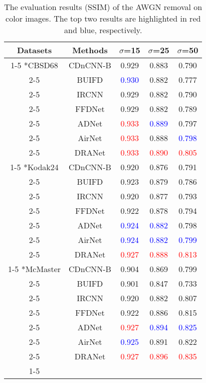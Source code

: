 \documentclass[3p,times]{elsarticle}
\begin{document}
\begin{table}[htbp]
\centering
\caption{The evaluation results (SSIM) of the AWGN removal on color images. The top two results are highlighted in red and blue, respectively.}
\label{tab:color_SSIM}
\begin{tabular}{ccccc}
\hline
Datasets & Methods & $\sigma$=15 & $\sigma$=25 & $\sigma$=50\\
\cline{1-5}
\multirow{7}*{CBSD68} & CDnCNN-B \cite{Zhang2017} & 0.929 & 0.883 & 0.790\\
\cline{2-5}
    & BUIFD \cite{Helou2020} & \textcolor{blue}{0.930} & 0.882 & 0.777\\
\cline{2-5}
    & IRCNN  \cite{ZhangZGZ2017} & 0.929 & 0.882 & 0.790\\
\cline{2-5}
    & FFDNet \cite{Zhang2018} & 0.929 & 0.882 & 0.789 \\
\cline{2-5}
    & ADNet \cite{TianX2020}  & \textcolor{red}{0.933} & \textcolor{blue}{0.889} & 0.797\\
\cline{2-5}
    & AirNet \cite{Li2022} & \textcolor{red}{0.933} & 0.888 & \textcolor{blue}{0.798}\\
\cline{2-5}
    & DRANet & \textcolor{red}{0.933} & \textcolor{red}{0.890} & \textcolor{red}{0.805}\\
\cline{1-5}
\multirow{7}*{Kodak24} & CDnCNN-B \cite{Zhang2017} & 0.920 & 0.876 & 0.791\\
\cline{2-5}
    & BUIFD \cite{Helou2020} & 0.923 & 0.879 & 0.786\\
\cline{2-5}
    & IRCNN  \cite{ZhangZGZ2017} & 0.920 & 0.877 & 0.793\\
\cline{2-5}
    & FFDNet \cite{Zhang2018} & 0.922 & 0.878 & 0.794\\
\cline{2-5}
    & ADNet \cite{TianX2020}  & \textcolor{blue}{0.924} & \textcolor{blue}{0.882} & 0.798\\
\cline{2-5}
    & AirNet \cite{Li2022} & \textcolor{blue}{0.924} & \textcolor{blue}{0.882} & \textcolor{blue}{0.799}\\
\cline{2-5}
    & DRANet & \textcolor{red}{0.927} & \textcolor{red}{0.888} & \textcolor{red}{0.813}\\
\cline{1-5}
\multirow{7}*{McMaster} & CDnCNN-B \cite{Zhang2017} & 0.904 & 0.869 & 0.799\\
\cline{2-5}
    & BUIFD \cite{Helou2020} & 0.901 & 0.847 & 0.733\\
\cline{2-5}
    & IRCNN  \cite{ZhangZGZ2017} & 0.920 & 0.882 & 0.807\\
\cline{2-5}
    & FFDNet \cite{Zhang2018} & 0.922 & 0.886 & 0.815 \\
\cline{2-5}
    & ADNet \cite{TianX2020}  & \textcolor{red}{0.927} & \textcolor{blue}{0.894} & \textcolor{blue}{0.825}\\
\cline{2-5}
    & AirNet \cite{Li2022} & \textcolor{blue}{0.925} & 0.891 & 0.822\\
\cline{2-5}
    & DRANet & \textcolor{red}{0.927} & \textcolor{red}{0.896} & \textcolor{red}{0.835}\\
\cline{1-5}
\end{tabular}
\end{table}
\end{document}
